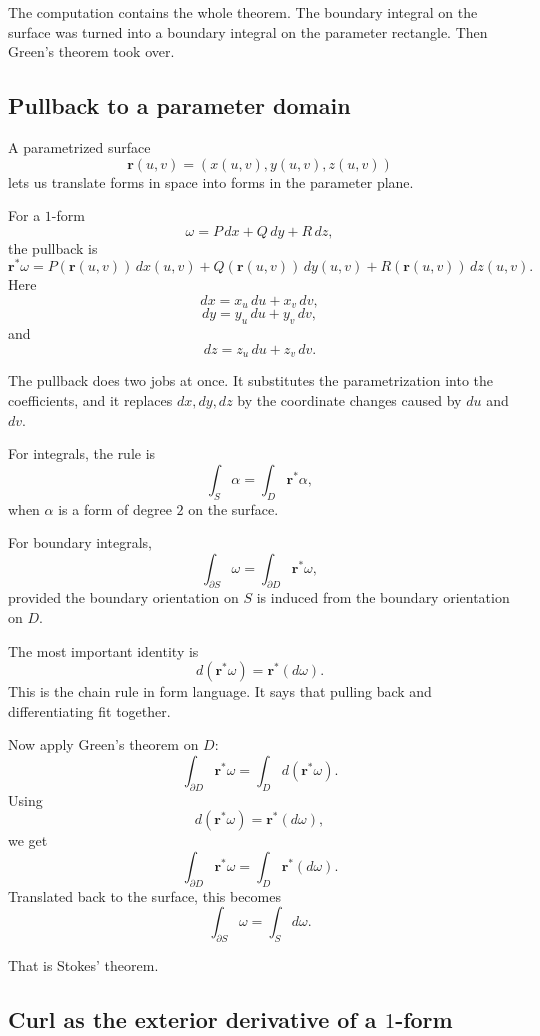 The computation contains the whole theorem.  The boundary integral on the surface was
turned into a boundary integral on the parameter rectangle.  Then Green's theorem took
over.

\subsection{Pullback to a parameter domain}

A parametrized surface
\[
    \mathbf r(u,v)=(x(u,v),y(u,v),z(u,v))
\]
lets us translate forms in space into forms in the parameter plane.

For a \(1\)-form
\[
    \omega=P\,dx+Q\,dy+R\,dz,
\]
the pullback is
\[
\boxed{
    \mathbf r^*\omega
    =
    P(\mathbf r(u,v))\,d x(u,v)
    +
    Q(\mathbf r(u,v))\,d y(u,v)
    +
    R(\mathbf r(u,v))\,d z(u,v).
}
\]
Here
\[
    dx=x_u\,du+x_v\,dv,
\]
\[
    dy=y_u\,du+y_v\,dv,
\]
and
\[
    dz=z_u\,du+z_v\,dv.
\]

The pullback does two jobs at once.  It substitutes the parametrization into the
coefficients, and it replaces \(dx,dy,dz\) by the coordinate changes caused by \(du\)
and \(dv\).

For integrals, the rule is
\[
\boxed{
    \int_S \alpha=\int_D \mathbf r^*\alpha,
}
\]
when \(\alpha\) is a form of degree \(2\) on the surface.

For boundary integrals,
\[
\boxed{
    \int_{\partial S}\omega=\int_{\partial D}\mathbf r^*\omega,
}
\]
provided the boundary orientation on \(S\) is induced from the boundary orientation
on \(D\).

The most important identity is
\[
\boxed{
    d(\mathbf r^*\omega)=\mathbf r^*(d\omega).
}
\]
This is the chain rule in form language.  It says that pulling back and differentiating
fit together.

Now apply Green's theorem on \(D\):
\[
    \int_{\partial D}\mathbf r^*\omega
    =
    \int_D d(\mathbf r^*\omega).
\]
Using
\[
    d(\mathbf r^*\omega)=\mathbf r^*(d\omega),
\]
we get
\[
    \int_{\partial D}\mathbf r^*\omega
    =
    \int_D \mathbf r^*(d\omega).
\]
Translated back to the surface, this becomes
\[
    \int_{\partial S}\omega=\int_S d\omega.
\]

That is Stokes' theorem.

\subsection{Curl as the exterior derivative of a \(1\)-form}

